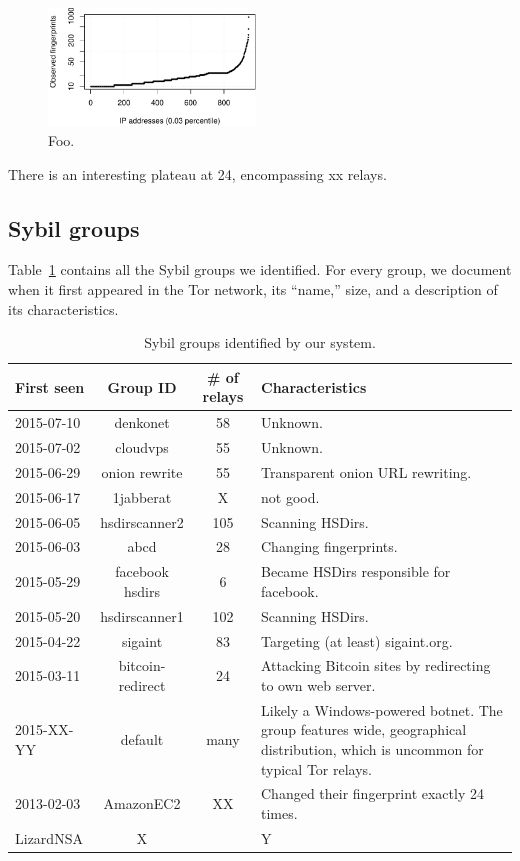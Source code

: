 \begin{figure}[t]
	\centering
	\includegraphics[width=0.49\textwidth]{diagrams/fingerprints.pdf}
	\caption{Foo.}
	\label{fig:fingerprints}
\end{figure}

There is an interesting plateau at 24, encompassing xx relays.

\subsection{Sybil groups}
\label{sec:sybil_groups}
Table~\ref{tab:sybils} contains all the Sybil groups we identified.  For every
group, we document when it first appeared in the Tor network, its ``name,''
size, and a description of its characteristics.

\begin{table}[t]
\centering
\begin{tabular}{l c c p{10cm}}
\textbf{First seen} & \textbf{Group ID} & \textbf{\# of relays} & \textbf{Characteristics} \\
\hline
2015-07-10 & denkonet & 58 & Unknown. \\
2015-07-02 & cloudvps & 55 & Unknown. \\
2015-06-29 & onion rewrite & 55 & Transparent onion URL rewriting. \\
2015-06-17 & 1jabberat & X & not good. \\
2015-06-05 & hsdirscanner2 & 105 & Scanning HSDirs. \\
2015-06-03 & abcd & 28 & Changing fingerprints. \\
2015-05-29 & facebook hsdirs & 6 & Became HSDirs responsible for facebook.  \\
2015-05-20 & hsdirscanner1 & 102 & Scanning HSDirs. \\
2015-04-22 & sigaint & 83 & Targeting (at least) sigaint.org. \\
2015-03-11 & bitcoin-redirect & 24 & Attacking Bitcoin sites by redirecting to own web server. \\
2015-XX-YY & default & many & Likely a Windows-powered botnet.  The group
features wide, geographical distribution, which is uncommon for typical Tor
relays. \\
2013-02-03 & AmazonEC2 & XX & Changed their fingerprint exactly 24 times. \\
LizardNSA & X & & Y \\
\end{tabular}
\caption{Sybil groups identified by our system.}
\label{tab:sybils}
\end{table}

